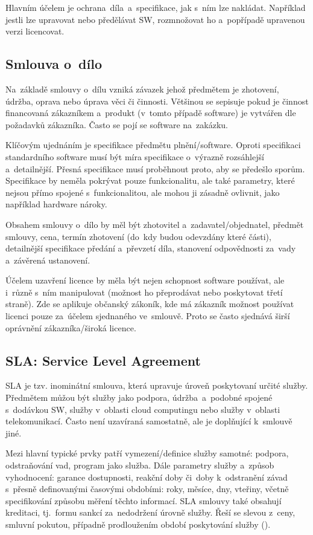 Hlavním účelem je ochrana~díla~a~specifikace, jak s~ním lze nakládat. Například jestli lze upravovat nebo předělávat SW, rozmnožovat ho a~popřípadě upravenou verzi licencovat.

\subsection{Smlouva o~dílo}

Na~základě smlouvy o~dílu vzniká závazek jehož předmětem je zhotovení, údržba, oprava nebo úprava věci či činnosti. Většinou se sepisuje pokud je činnost financovaná zákazníkem a~produkt (v~tomto případě software) je vytvářen dle požadavků zákazníka. Často se pojí se software na~zakázku.

Klíčovým ujednáním je specifikace předmětu plnění/software. Oproti specifikaci standardního software musí být míra specifikace o~výrazně rozsáhlejší a~detailnější. Přesná specifikace musí proběhnout proto, aby se předešlo sporům. Specifikace by neměla pokrývat pouze funkcionalitu, ale také parametry, které nejsou přímo spojené s~funkcionalitou, ale mohou ji zásadně ovlivnit, jako například hardware nároky.

Obsahem smlouvy o~dílo by měl být zhotovitel a~zadavatel/objednatel, předmět smlouvy, cena, termín zhotovení (do~kdy budou odevzdány které části), detailnější specifikace předání a~převzetí díla, stanovení odpovědnosti za~vady a~závěrená ustanovení.

Účelem uzavření licence by měla být nejen schopnost software používat, ale i~různě s~ním manipulovat (možnost ho přeprodávat nebo poskytovat třetí straně). Zde se aplikuje občanský zákoník, kde má zákazník možnost používat licenci pouze za~účelem sjednaného ve~smlouvě. Proto se často sjednává širší oprávnění zákazníka/široká licence.

\subsection{SLA: Service Level Agreement}

SLA je tzv. inominátní smlouva, která upravuje úroveň poskytovaní určité služby. Předmětem můžou být služby jako podpora, údržba~a~podobné spojené s~dodávkou SW, služby v~oblasti cloud computingu nebo služby v~oblasti telekomunikací. Často není uzavíraná samostatně, ale je doplňující k~smlouvě jiné.

Mezi hlavní typické prvky patří vymezení/definice služby samotné: podpora, odstraňování vad, program jako služba. Dále parametry služby a~způsob vyhodnocení: garance dostupnosti, reakční doby či~doby k~odstranění závad s~přesně definovanými časovými obdobími: roky, měsíce, dny, vteřiny, včetně specifikování způsobu měření těchto informací. SLA smlouvy také obsahují kreditaci, tj.~formu sankcí za~nedodržení úrovně služby. Řeší se slevou z~ceny, smluvní pokutou, případně prodloužením období poskytování služby ().

